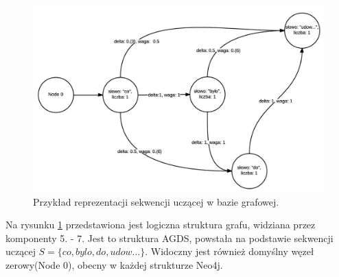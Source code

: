\begin{figure}[h!]
    \label{graph:logic_graph}
    \includegraphics[width=\textwidth]{logic_graph}
    \caption{Przykład reprezentacji sekwencji uczącej w bazie grafowej.}
\end{figure}

Na rysunku \ref{graph:logic_graph} przedstawiona jest logiczna struktura grafu, widziana przez komponenty 5. - 7. Jest to struktura AGDS, powstała na podstawie sekwencji uczącej
$S = \{co, byl{}o, do, udow...\}$. Widoczny jest również domyślny węzeł zerowy(Node 0), obecny w każdej strukturze Neo4j.
